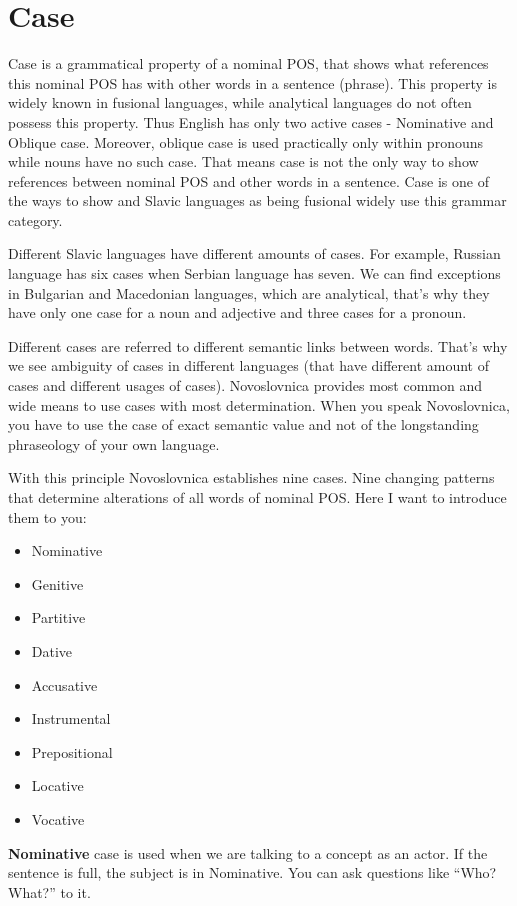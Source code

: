 \section{Case}

Case is a grammatical property of a nominal POS, that shows what references this nominal POS has with other words in a sentence (phrase). This property is widely known in fusional languages, while analytical languages do not often possess this property. Thus English has only two active cases - Nominative and Oblique case. Moreover, oblique case is used practically only within pronouns while nouns have no such case. That means case is not the only way to show references between nominal POS and other words in a sentence. Case is one of the ways to show and Slavic languages as being fusional widely use this grammar category.

Different Slavic languages have different amounts of cases. For example, Russian language has six cases when Serbian language has seven. We can find exceptions in Bulgarian and Macedonian languages, which are analytical, that’s why they have only one case for a noun and adjective and three cases for a pronoun.

Different cases are referred to different semantic links between words. That’s why we see ambiguity of cases in different languages (that have different amount of cases and different usages of cases). Novoslovnica provides most common and wide means to use cases with most determination. When you speak Novoslovnica, you have to use the case of exact semantic value and not of the longstanding phraseology of your own language.

With this principle Novoslovnica establishes nine cases. Nine changing patterns that determine alterations of all words of nominal POS. Here I want to introduce them to you:

\begin{itemize}
	\item Nominative
	\item Genitive
	\item Partitive
	\item Dative
	\item Accusative
	\item Instrumental
	\item Prepositional
	\item Locative
	\item Vocative
\end{itemize}

\textbf{Nominative} case is used when we are talking to a concept as an actor. If the sentence is full, the subject is in Nominative. You can ask questions like “Who? What?” to it.

